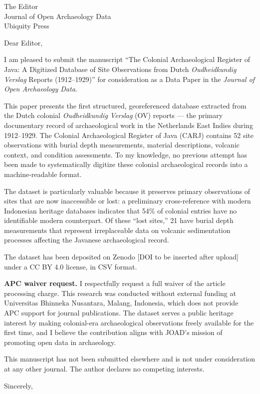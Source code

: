 \documentclass[11pt]{letter}
\begin{document}
\begin{letter}{The Editor\\
Journal of Open Archaeology Data\\
Ubiquity Press}

\opening{Dear Editor,}

I am pleased to submit the manuscript ``The Colonial Archaeological Register of Java: A Digitized Database of Site Observations from Dutch \textit{Oudheidkundig Verslag} Reports (1912--1929)'' for consideration as a Data Paper in the \textit{Journal of Open Archaeology Data}.

This paper presents the first structured, georeferenced database extracted from the Dutch colonial \textit{Oudheidkundig Verslag} (OV) reports --- the primary documentary record of archaeological work in the Netherlands East Indies during 1912--1929. The Colonial Archaeological Register of Java (CARJ) contains 52 site observations with burial depth measurements, material descriptions, volcanic context, and condition assessments. To my knowledge, no previous attempt has been made to systematically digitize these colonial archaeological records into a machine-readable format.

The dataset is particularly valuable because it preserves primary observations of sites that are now inaccessible or lost: a preliminary cross-reference with modern Indonesian heritage databases indicates that 54\% of colonial entries have no identifiable modern counterpart. Of these ``lost sites,'' 21 have burial depth measurements that represent irreplaceable data on volcanic sedimentation processes affecting the Javanese archaeological record.

The dataset has been deposited on Zenodo [DOI to be inserted after upload] under a CC BY 4.0 license, in CSV format.

\textbf{APC waiver request.} I respectfully request a full waiver of the article processing charge. This research was conducted without external funding at Universitas Bhinneka Nusantara, Malang, Indonesia, which does not provide APC support for journal publications. The dataset serves a public heritage interest by making colonial-era archaeological observations freely available for the first time, and I believe the contribution aligns with JOAD's mission of promoting open data in archaeology.

This manuscript has not been submitted elsewhere and is not under consideration at any other journal. The author declares no competing interests.

\closing{Sincerely,}

\end{letter}
\end{document}
